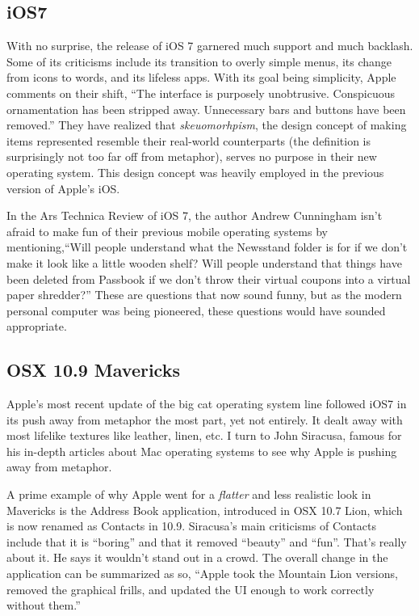 \documentclass[11pt, oneside]{article}
\begin{document}
\subsection{iOS7}
With no surprise, the release of iOS 7 garnered much support and much backlash. Some of its criticisms include its transition to overly simple menus, its change from icons to words, and its lifeless apps. With its goal being simplicity, Apple comments on their shift, ``The interface is purposely unobtrusive. Conspicuous ornamentation has been stripped away. Unnecessary bars and buttons have been removed.'' \cite{apple-design} They have realized that \textit{skeuomorhpism}, the design concept of making items represented resemble their real-world counterparts (the definition is surprisingly not too far off from metaphor), serves no purpose in their new operating system. This design concept was heavily employed in the previous version of Apple's iOS.

In the Ars Technica Review of iOS 7, the author Andrew Cunningham isn't afraid to make fun of their previous mobile operating systems by mentioning,``Will people understand what the Newsstand folder is for if we don't make it look like a little wooden shelf? Will people understand that things have been deleted from Passbook if we don't throw their virtual coupons into a virtual paper shredder?'' \cite{ars-technica-iOS7} These are questions that now sound funny, but as the modern personal computer was being pioneered, these questions would have sounded appropriate.

\subsection{OSX 10.9 Mavericks}
Apple's most recent update of the big cat operating system line followed iOS7 in its push away from metaphor the most part, yet not entirely. It dealt away with most lifelike textures like leather, linen, etc. I turn to John Siracusa, famous for his in-depth articles about Mac operating systems to see why Apple is pushing away from metaphor.

A prime example of why Apple went for a \textit{flatter} and less realistic look in Mavericks is the Address Book application, introduced in OSX 10.7 Lion, which is now renamed as Contacts in 10.9. Siracusa's main criticisms of Contacts include that it is ``boring'' and that it removed ``beauty'' and ``fun''. That's really about it. He says it wouldn't stand out in a crowd. The overall change in the application can be summarized as so, ``Apple took the Mountain Lion versions, removed the graphical frills, and updated the UI enough to work correctly without them.'' \cite{ars-technica-mavericks} 
\end{document}
